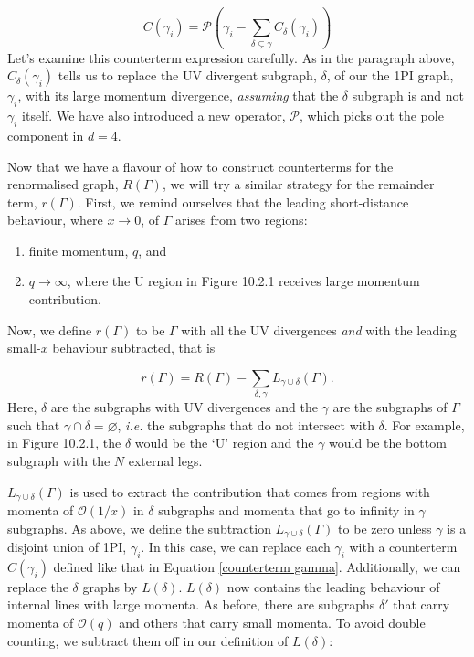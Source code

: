 \documentclass{scrartcl}
\begin{document}
\begin{equation}
    C(\gamma_i) = \mathcal{P}\left(\gamma_i - \sum_{\delta \varsubsetneq \gamma}C_\delta(\gamma_i)\right)
    \label{counterterm gamma}
\end{equation}
Let's examine this counterterm expression carefully. As in the paragraph above, $C_\delta(\gamma_i)$ tells us to replace the UV divergent subgraph, $\delta$, of our the 1PI graph, $\gamma_i$, with its large momentum divergence, \textit{assuming} that the $\delta$ subgraph is and not $\gamma_i$ itself. We have also introduced a new operator, $\mathcal{P}$, which picks out the pole component in $d=4$. 

Now that we have a flavour of how to construct counterterms for the renormalised graph, $R(\Gamma)$, we will try a similar strategy for the remainder term, $r(\Gamma)$. First, we remind ourselves that the leading short-distance behaviour, where $x\rightarrow 0$, of $\Gamma$ arises from two regions:

\begin{enumerate}
    \item finite momentum, $q$, and
    \item $q\rightarrow \infty$, where the U region in Figure 10.2.1 receives large momentum contribution.
\end{enumerate}

Now, we define $r(\Gamma)$ to be $\Gamma$ with all the UV divergences \textit{and} with the leading small-$x$ behaviour subtracted, that is

\begin{equation}
    r(\Gamma) = R(\Gamma) - \sum_{\delta,\gamma} L_{\gamma \cup \delta}(\Gamma).
\end{equation}
Here, $\delta$ are the subgraphs with UV divergences and the $\gamma$ are the subgraphs of $\Gamma$ such that $\gamma\cap\delta=\varnothing$, \textit{i.e.} the subgraphs that do not intersect with $\delta$. For example, in Figure 10.2.1, the $\delta$ would be the `U' region and the $\gamma$ would be the bottom subgraph with the $N$ external legs. 

$L_{\gamma\cup\delta}(\Gamma)$ is used to extract the contribution that comes from regions with momenta of $\mathcal{O}(1/x)$ in $\delta$ subgraphs and momenta that go to infinity in $\gamma$ subgraphs. As above, we define the subtraction $L_{\gamma\cup\delta}(\Gamma)$ to be zero unless $\gamma$ is a disjoint union of 1PI, $\gamma_i$. In this case, we can replace each $\gamma_i$ with a counterterm $C(\gamma_i)$ defined like that in Equation \ref{counterterm gamma}. Additionally, we can replace the $\delta$ graphs by $L(\delta)$. $L(\delta)$ now contains the leading behaviour of internal lines with large momenta. As before, there are subgraphs $\delta'$ that carry momenta of $\mathcal{O}(q)$ and others that carry small momenta. To avoid double counting, we subtract them off in our definition of $L(\delta)$:
\end{document}
